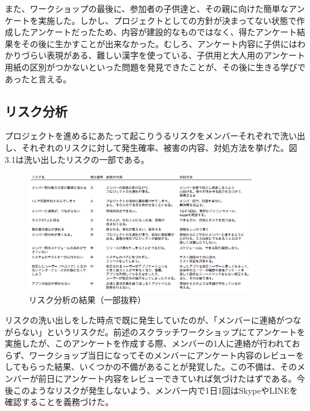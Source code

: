\documentclass[openany,11pt,papersize]{jsbook}
\begin{document}
\par また、ワークショップの最後に、参加者の子供達と、その親に向けた簡単なアンケートを実施した。しかし、プロジェクトとしての方針が決まってない状態で作成したアンケートだったため、内容が建設的なものではなく、得たアンケート結果をその後に生かすことが出来なかった。むしろ、アンケート内容に子供にはわかりづらい表現がある、難しい漢字を使っている、子供用と大人用のアンケート用紙の区別がつかないといった問題を発見できたことが、その後に生きる学びであったと言える。


\subsection{リスク分析}
\par プロジェクトを進めるにあたって起こりうるリスクをメンバーそれぞれで洗い出し、それぞれのリスクに対して発生確率、被害の内容、対処方法を挙げた。図3.1は洗い出したリスクの一部である。

\begin{figure}[H]
\begin{center}
\includegraphics[width=10cm, bb=0 0 753 394]{img/RiskManagement.png}
\end{center}
\caption{リスク分析の結果（一部抜粋）}
\end{figure}

\par リスクの洗い出しをした時点で既に発生していたのが、「メンバーに連絡がつながらない」というリスクだ。前述のスクラッチワークショップにてアンケートを実施したが、このアンケートを作成する際、メンバーの1人に連絡が行われておらず、ワークショップ当日になってそのメンバーにアンケート内容のレビューをしてもらった結果、いくつかの不備があることが発覚した。この不備は、そのメンバーが前日にアンケート内容をレビューできていれば気づけたはずである。今後このようなリスクが発生しないよう、メンバー内で1日1回はSkypeやLINEを確認することを義務づけた。
\end{document}
